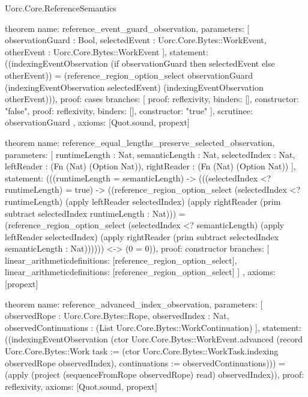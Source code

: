 \begin{lexlean}{Uorc.Core.ReferenceSemantics}
\begin{semanticmodule}
theorem{
  name: reference_event_guard_observation,
  parameters: [
    observationGuard : Bool,
    selectedEvent : Uorc.Core.Bytes::WorkEvent,
    otherEvent : Uorc.Core.Bytes::WorkEvent
  ],
  statement: ((indexingEventObservation (if observationGuard then selectedEvent else otherEvent)) = (reference_region_option_select observationGuard (indexingEventObservation selectedEvent) (indexingEventObservation otherEvent))),
  proof: cases{
    branches: [
      {proof: reflexivity{}, binders: [], constructor: "false"},
      {proof: reflexivity{}, binders: [], constructor: "true"}
    ],
    scrutinee: observationGuard
  },
  axioms: [Quot.sound, propext]
}

theorem{
  name: reference_equal_lengths_preserve_selected_observation,
  parameters: [
    runtimeLength : Nat,
    semanticLength : Nat,
    selectedIndex : Nat,
    leftReader : (Fn (Nat) (Option Nat)),
    rightReader : (Fn (Nat) (Option Nat))
  ],
  statement: (((runtimeLength = semanticLength) -> (((selectedIndex <? runtimeLength) = true) -> ((reference_region_option_select (selectedIndex <? runtimeLength) (apply leftReader selectedIndex) (apply rightReader (prim subtract selectedIndex runtimeLength : Nat))) = (reference_region_option_select (selectedIndex <? semanticLength) (apply leftReader selectedIndex) (apply rightReader (prim subtract selectedIndex semanticLength : Nat)))))) <-> (0 = 0)),
  proof: constructor{
    branches: [
      linear_arithmetic{definitions: [reference_region_option_select]},
      linear_arithmetic{definitions: [reference_region_option_select]}
    ]
  },
  axioms: [propext]
}

theorem{
  name: reference_advanced_index_observation,
  parameters: [
    observedRope : Uorc.Core.Bytes::Rope,
    observedIndex : Nat,
    observedContinuations : (List Uorc.Core.Bytes::WorkContinuation)
  ],
  statement: ((indexingEventObservation (ctor Uorc.Core.Bytes::WorkEvent.advanced (record Uorc.Core.Bytes::Work {task := (ctor Uorc.Core.Bytes::WorkTask.indexing observedRope observedIndex), continuations := observedContinuations}))) = (apply (project (sequenceFromRope observedRope) read) observedIndex)),
  proof: reflexivity{},
  axioms: [Quot.sound, propext]
}


\end{semanticmodule}
\end{lexlean}
